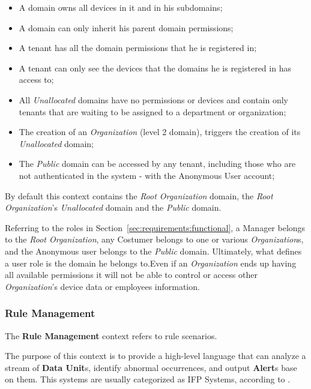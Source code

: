 \begin{itemize}
   \item A domain owns all devices in it and in his subdomains;
   \item A domain can only inherit his parent domain permissions;
   \item A tenant has all the domain permissions that he is registered in;
   \item A tenant can only see the devices that the domains he is registered in has access to;
   \item All \textit{Unallocated} domains have no permissions or devices and contain only tenants that are waiting to be assigned to a department or organization;
   \item The creation of an \textit{Organization} (level 2 domain), triggers the creation of its \textit{Unallocated} domain;
   \item The \textit{Public} domain can be accessed by any tenant, including those who are not authenticated in the system - with the Anonymous User account;
\end{itemize}

By default this context contains the \textit{Root Organization} domain, the \textit{Root Organization}'s  \textit{Unallocated} domain and the \textit{Public} domain.

Referring to the roles in Section~\ref{sec:requirements:functional}, a Manager belongs to the \textit{Root Organization}, any Costumer belongs to one or various \textit{Organization}s, and the Anonymous user belongs to the \textit{Public} domain.
Ultimately, what defines a user role is the domain he belongs to.Even if an \textit{Organization} ends up having all available permissions it will not be able to control or access other \textit{Organization}'s device data or employees information.

\subsubsection{Rule Management}
\label{subsubsec:design:domain:bounded_contexts:rule}

The \textbf{Rule Management} context refers to rule scenarios.

The purpose of this context is to provide a high-level language that can analyze a stream of \textbf{Data Unit}s, identify abnormal occurrences, and output \textbf{Alert}s base on them. This systems are usually categorized as \gls{IFP} Systems, according to \cite{cugola2012processing}.

